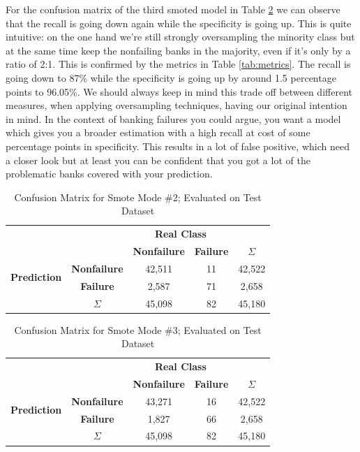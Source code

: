 \documentclass[12pt,a4paper]{article}
\begin{document}
For the confusion matrix of the third smoted model in Table \ref{tab:confMat_smote3} we can observe that the recall is going down again while the specificity is going up. This is quite intuitive: on the one hand we're still strongly oversampling the minority class but at the same time keep the nonfailing banks in the majority, even if it's only by a ratio of 2:1. This is confirmed by the metrics in Table \ref{tab:metrics}.  The recall is going down to 87\% while the specificity is going up by around 1.5 percentage points to 96.05\%. We should always keep in mind this trade off between different measures, when applying oversampling techniques, having our original intention in mind. In the context of banking failures you could argue, you want a model which gives you a broader estimation with a high recall at cost of some percentage points in specificity. This results in a lot of false positive, which need a closer look but at least you can be confident that you got a lot of the problematic banks covered with your prediction.
\begin{table}[]
\centering
\begin{tabular}{ccccc}
\multicolumn{2}{c}{} & \multicolumn{2}{c}{\textbf{Real Class}} &  \\
\multicolumn{2}{c}{} & \textbf{Nonfailure} & \textbf{Failure} & \textbf{$\Sigma$} \\ \cline{3-4}
\multirow{2}{*}{\textbf{Prediction}} & \multicolumn{1}{c|}{\textbf{Nonfailure}} & \multicolumn{1}{c|}{42,511} & \multicolumn{1}{c|}{11} & 42,522 \\ \cline{3-4}
 & \multicolumn{1}{c|}{\textbf{Failure}} & \multicolumn{1}{c|}{2,587} & \multicolumn{1}{c|}{71} & 2,658 \\ \cline{3-4}
 & \textbf{$\Sigma$} & 45,098 & 82 & 45,180
\end{tabular}
\caption{Confusion Matrix for Smote Mode \#2; Evaluated on Test Dataset}
\label{tab:confMat_smote2}
\end{table}
\begin{table}[]
\centering
\begin{tabular}{ccccc}
\multicolumn{2}{c}{} & \multicolumn{2}{c}{\textbf{Real Class}} &  \\
\multicolumn{2}{c}{} & \textbf{Nonfailure} & \textbf{Failure} & \textbf{$\Sigma$} \\ \cline{3-4}
\multirow{2}{*}{\textbf{Prediction}} & \multicolumn{1}{c|}{\textbf{Nonfailure}} & \multicolumn{1}{c|}{43,271} & \multicolumn{1}{c|}{16} & 42,522 \\ \cline{3-4}
 & \multicolumn{1}{c|}{\textbf{Failure}} & \multicolumn{1}{c|}{1,827} & \multicolumn{1}{c|}{66} & 2,658 \\ \cline{3-4}
 & \textbf{$\Sigma$} & 45,098 & 82 & 45,180
\end{tabular}
\caption{Confusion Matrix for Smote Mode \#3; Evaluated on Test Dataset}
\label{tab:confMat_smote3}
\end{table}
\end{document}

